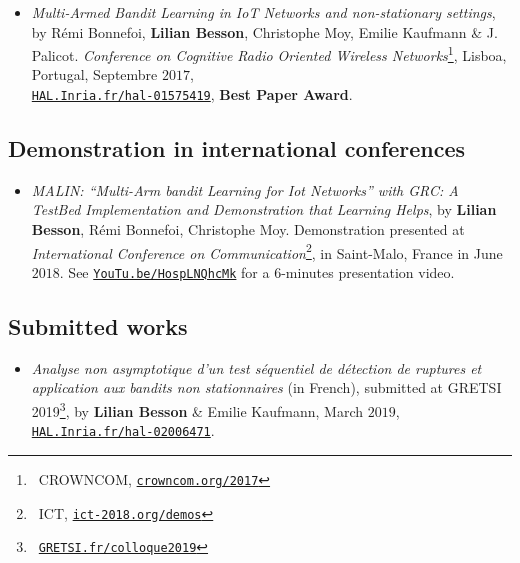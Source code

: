 \begin{itemize}
\item
    \emph{Multi-Armed Bandit Learning in IoT Networks and non-stationary settings},
    by Rémi Bonnefoi, \textbf{Lilian Besson}, Christophe Moy, Emilie Kaufmann \& J. Palicot.
    \emph{Conference on Cognitive Radio Oriented Wireless Networks}\footnote{~CROWNCOM, \href{http://crowncom.org/2017}{\texttt{crowncom.org/2017}}}, Lisboa, Portugal, Septembre $2017$,\\
    \href{https://HAL.Inria.fr/hal-01575419}{\texttt{HAL.Inria.fr/hal-01575419}},
    \textbf{Best Paper Award}.
    \cite{Bonnefoi17}

\end{itemize}

\subsection{Demonstration in international conferences}

\begin{itemize}

\item
    \emph{MALIN: ``Multi-Arm bandit Learning for Iot Networks'' with GRC: A TestBed Implementation and Demonstration that Learning Helps},
    by \textbf{Lilian Besson}, Rémi Bonnefoi, Christophe Moy.
    Demonstration presented at \emph{International Conference on Communication}\footnote{~ICT, \href{http://ict-2018.org/demos}{\texttt{ict-2018.org/demos}}}, in Saint-Malo, France in June $2018$.
    See \href{https://YouTu.be/HospLNQhcMk}{\texttt{YouTu.be/HospLNQhcMk}} for a $6$-minutes presentation video.
    \cite{Besson2018ICT}

\end{itemize}


\subsection{Submitted works}

\begin{itemize}
\item
    \emph{Analyse non asymptotique d'un test séquentiel de détection de ruptures et application aux bandits non stationnaires} (in French),
    submitted at GRETSI 2019\footnote{~\href{http://GRETSI.fr/colloque2019}{\texttt{GRETSI.fr/colloque2019}}},
    by \textbf{Lilian Besson} \& Emilie Kaufmann, March $2019$,
    \href{https://HAL.Inria.fr/hal-02006471}{\texttt{HAL.Inria.fr/hal-02006471}}.
    \cite{Besson2019Gretsi}

\end{itemize}


